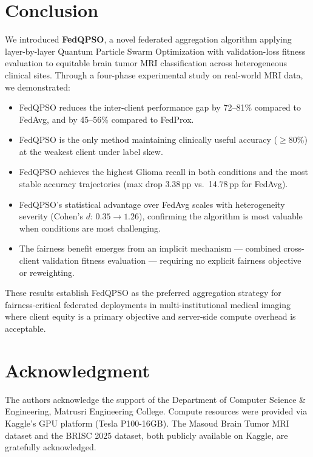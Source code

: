 \documentclass[conference]{IEEEtran}
\begin{document}
\section{Conclusion}
\label{sec:conclusion}

We introduced \textbf{FedQPSO}, a novel federated aggregation algorithm
applying layer-by-layer Quantum Particle Swarm Optimization with
validation-loss fitness evaluation to equitable brain tumor MRI classification
across heterogeneous clinical sites. Through a four-phase experimental study
on real-world MRI data, we demonstrated:

\begin{itemize}
    \item FedQPSO reduces the inter-client performance gap by 72--81\%
    compared to FedAvg, and by 45--56\% compared to FedProx.

    \item FedQPSO is the only method maintaining clinically useful
    accuracy ($\geq$80\%) at the weakest client under label skew.

    \item FedQPSO achieves the highest Glioma recall in both conditions
    and the most stable accuracy trajectories (max drop 3.38\,pp vs.\
    14.78\,pp for FedAvg).

    \item FedQPSO's statistical advantage over FedAvg scales with
    heterogeneity severity (Cohen's $d$: $0.35 \to 1.26$), confirming
    the algorithm is most valuable when conditions are most challenging.

    \item The fairness benefit emerges from an implicit mechanism ---
    combined cross-client validation fitness evaluation --- requiring no
    explicit fairness objective or reweighting.
\end{itemize}

These results establish FedQPSO as the preferred aggregation strategy for
fairness-critical federated deployments in multi-institutional medical
imaging where client equity is a primary objective and server-side compute
overhead is acceptable.

\section*{Acknowledgment}
The authors acknowledge the support of the Department of Computer Science \&
Engineering, Matrusri Engineering College. Compute resources were provided
via Kaggle's GPU platform (Tesla P100-16GB). The Masoud Brain Tumor MRI
dataset and the BRISC 2025 dataset, both publicly available on Kaggle, are
gratefully acknowledged.
\end{document}

